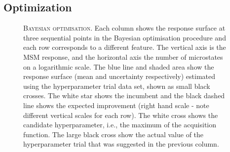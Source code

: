 \subsection{Optimization}\label{sec:ala_opt}

\begin{figure}[p]
    \centering
    \caption[Bayesian optimisation]{\textsc{Bayesian optimisation}. Each column shows the response surface at three sequential points in the Bayesian optimisation procedure and each row corresponds to a different feature. The vertical axis is the MSM response, and the horizontal axis the number of microstates on a logarithmic scale. The blue line and shaded area show the response surface (mean and uncertainty respectively) estimated using the hyperparameter trial data set, shown as small black crosses. The white star shows the incumbent and the black dashed line shows the expected improvement (right hand scale - note different vertical scales for each row). The white cross shows the candidate hyperparameter, i.e., the maximum of the acquisition function. The large black cross show the actual value of the hyperparameter trial that was suggested in the previous column.}

\end{figure}
